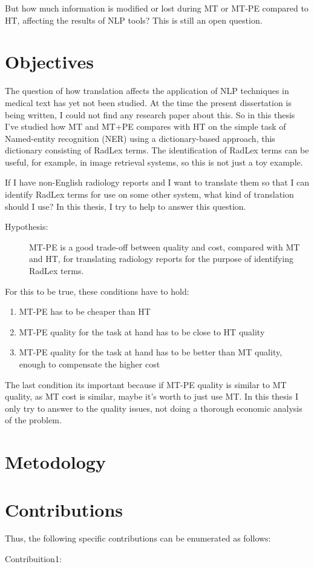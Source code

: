 But how much information is modified or lost during MT or MT-PE compared to HT, affecting the results of NLP tools? This is still an open question. 

\section{Objectives}

The question of how translation affects the application of NLP techniques in medical text has yet not been studied. At the time the present dissertation is being written, I could not find any research paper about this. So in this thesis I've studied how MT and MT+PE compares with HT on the simple task of Named-entity recognition (NER) using a dictionary-based approach, this dictionary consisting of RadLex terms. The identification of RadLex terms can be useful, for example, in image retrieval \citep{Gerstmair2012} systems, so this is not just a toy example. 

If I have non-English radiology reports and I want to translate them so that I can identify RadLex terms for use on some other system, what kind of translation should I use? In this thesis, I try to help to answer this question. 

\newcommand{\hypothesis}{
\begin{description}
	\item[Hypothesis:] MT-PE is a good trade-off between quality and cost, compared with MT and HT, for translating radiology reports for the purpose of identifying RadLex terms. 
\end{description}
}
\hypothesis

For this to be true, these conditions have to hold:

\begin{enumerate}
	\item MT-PE has to be cheaper than HT
	\item MT-PE quality for the task at hand has to be close to HT quality
	\item MT-PE quality for the task at hand has to be better than MT quality, enough to compensate the higher cost
\end{enumerate}

The last condition its important because if MT-PE quality is similar to MT quality, as MT cost is similar, maybe it's worth to just use MT. In this thesis I only try to answer to the quality issues, not doing a thorough economic analysis of the problem. 

\section{Metodology}




\section{Contributions}


Thus, the following specific contributions can be enumerated as follows:
\begin{description}
	\item[Contribuition1:] 
\end{description}


